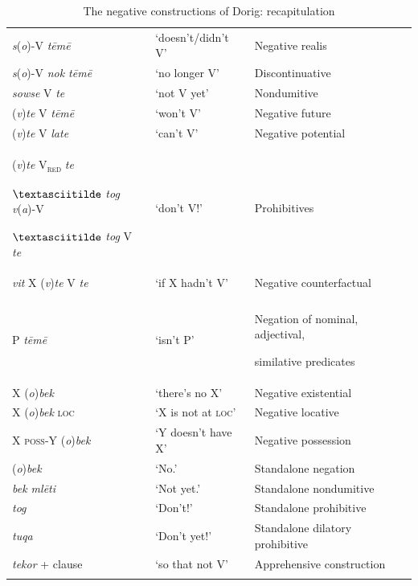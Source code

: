 \documentclass[output=paper,colorlinks,citecolor=brown,draft]{langscibook}
\begin{document}
\begin{table}
    \begin{tabularx}{\textwidth}{p{25mm}lQl}
\lsptoprule 
{}\\
\midrule
\textit{s}(\textit{o})-V \textit{tēmē} & ‘doesn’t/didn’t V’  & Negative realis  &   \\
\textit{s}(\textit{o})-V \textit{nok tēmē}  & ‘no longer V’  & Discontinuative  &   \\
\textit{sowse} V \textit{te}  & ‘not V yet’  & Nondumitive   &   \\
(\textit{v})\textit{te} V \textit{tēmē}  & ‘won’t V’  & Negative future  &   \\
(\textit{v})\textit{te} V \textit{late}  & ‘can’t V’  & Negative potential  &   \\

(\textit{v})\textit{te} V\textsubscript{\textsc{red}} \textit{te} 

$\textasciitilde$ \textit{tog} \textit{v}(\textit{a})-V

$\textasciitilde$ \textit{tog} V \textit{te} 
& ‘don’t V!’  & Prohibitives  &   \\
\textit{vit} X (\textit{v})\textit{te} V \textit{te}  & ‘if X hadn’t V’  & Negative counterfactual  &   \\

\tablevspace
{}\\
\midrule
P \textit{tēmē}  & ‘isn’t P’  & Negation of nominal, adjectival, 

similative predicates  &   \\
X (\textit{o})\textit{bek}  & ‘there’s no X’  & Negative existential  &   \\
X (\textit{o})\textit{bek} \textsc{loc}  & ‘X is not at \textsc{loc}’  & Negative locative  &   \\
X \textsc{poss}-Y (\textit{o})\textit{bek}  & ‘Y doesn’t have X’  & Negative possession  &   \\
(\textit{o})\textit{bek}  & ‘No.’  & Standalone negation  &   \\
\textit{bek mlēti}  & ‘Not yet.’  & Standalone nondumitive  &   \\
\textit{tog}  & ‘Don’t!’  & Standalone prohibitive  &   \\
\textit{tuqa}  & ‘Don’t yet!’  & Standalone dilatory prohibitive  &   \\
\textit{tekor} + clause  & ‘so that not V’  & Apprehensive construction  &  \\
\lspbottomrule
    \end{tabularx}
    \caption{The negative constructions of Dorig: recapitulation}
    \label{tab:dor:recap}
\end{table}
\end{document}
